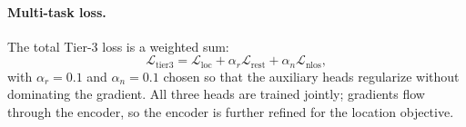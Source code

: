 \paragraph{Multi-task loss.}
The total Tier-3 loss is a weighted sum:
\begin{equation}
  \mathcal{L}_{\mathrm{tier3}} =
  \mathcal{L}_{\mathrm{loc}} + \alpha_r \mathcal{L}_{\mathrm{rest}}
  + \alpha_n \mathcal{L}_{\mathrm{nlos}},
  \label{eq:multi}
\end{equation}
with $\alpha_r = 0.1$ and $\alpha_n = 0.1$ chosen so that the
auxiliary heads regularize without dominating the gradient. All
three heads are trained jointly; gradients flow through the
encoder, so the encoder is further refined for the location
objective.
